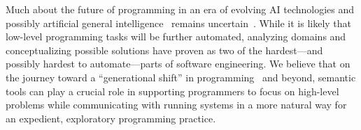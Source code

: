 \ParSep

Much about the future of programming in an era of evolving AI technologies and possibly artificial general intelligence~\cite{bubeck2023sparks} remains uncertain~\cite{tanimoto2023five}.
While it is likely that low-level programming tasks will be further automated, analyzing domains and conceptualizing possible solutions have proven as two of the hardest---and possibly hardest to automate---parts of software engineering.
We believe that on the journey toward a ``generational shift'' in programming~\cite{sarkar2023code} and beyond, semantic tools can play a crucial role in supporting programmers to focus on high-level problems while communicating with running systems in a more natural way for an expedient, exploratory programming practice.

